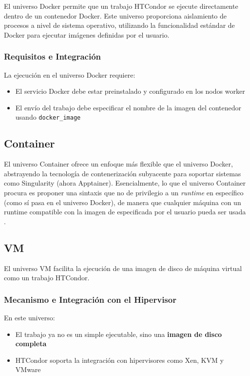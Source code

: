El universo Docker permite que un trabajo HTCondor se ejecute directamente dentro de un contenedor Docker. Este universo proporciona aislamiento de procesos a nivel de sistema operativo, utilizando la funcionalidad estándar de Docker para ejecutar imágenes definidas por el usuario.

\subsubsection{Requisitos e Integración}

La ejecución en el universo Docker requiere:

\begin{itemize}
	\item El servicio Docker debe estar preinstalado y configurado en los nodos worker
	\item El envío del trabajo debe especificar el nombre de la imagen del contenedor usando \texttt{docker\_image}
\end{itemize}


\subsection{Container}

El universo Container ofrece un enfoque más flexible que el universo Docker, abstrayendo la tecnología de contenerización subyacente para soportar sistemas como Singularity (ahora Apptainer). Esencialmente, lo que el universo Container procura es proponer una sintaxis que no de privilegio a un \textit{runtime} en específico  (como sí pasa en el universo Docker), de manera que cualquier máquina con un runtime compatible con la imagen de especificada por el usuario pueda ser usada \citep{HTCondor-env-services}.


\subsection{VM}

El universo VM facilita la ejecución de una imagen de disco de máquina virtual como un trabajo HTCondor.
\subsubsection{Mecanismo e Integración con el Hipervisor}

En este universo:

\begin{itemize}
	\item El trabajo ya no es un simple ejecutable, sino una \textbf{imagen de disco completa}
	\item HTCondor soporta la integración con hipervisores como Xen, KVM y VMware \citep{HTCondor_vm_universe_wiki}
\end{itemize}

